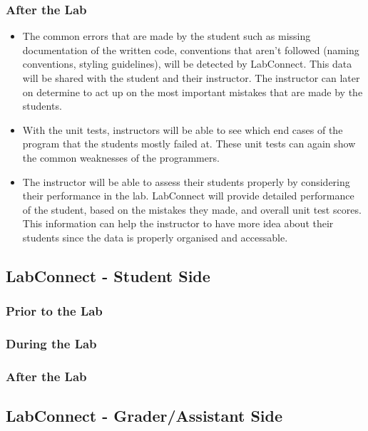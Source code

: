 \documentclass[a4paper, 12pt]{article}
\begin{document}
    \subsubsection{After the Lab}
    \begin{itemize}
        \item The common errors that are made by the student such as missing documentation 
        of the written code, conventions that aren't followed (naming conventions, styling 
        guidelines), will be detected by LabConnect. This data will be shared with the student
        and their instructor. The instructor can later on determine to act up on the most
        important mistakes that are made by the students.
        \item With the unit tests, instructors will be able to see which end cases of the program
        that the students mostly failed at. These unit tests can again show the common weaknesses
        of the programmers.
        \item The instructor will be able to assess their students properly by considering their
        performance in the lab. LabConnect will provide detailed performance of the student, 
        based on the mistakes they made, and overall unit test scores. This information can help
        the instructor to have more idea about their students since the data is properly organised
        and accessable.
    \end{itemize}
    
    \subsection{LabConnect - Student Side}

    \subsubsection{Prior to the Lab}
    \subsubsection{During the Lab}
    \subsubsection{After the Lab}
    
    \subsection{LabConnect - Grader/Assistant Side}
\end{document}
